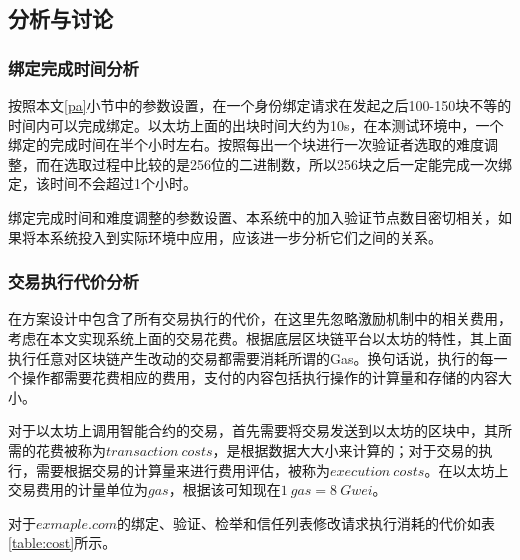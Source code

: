 \subsection{分析与讨论}

\subsubsection{绑定完成时间分析}

按照本文\ref{pa}小节中的参数设置，在一个身份绑定请求在发起之后100-150块不等的时间内可以完成绑定。以太坊上面的出块时间大约为10s，在本测试环境中，一个绑定的完成时间在半个小时左右。按照每出一个块进行一次验证者选取的难度调整，而在选取过程中比较的是256位的二进制数，所以256块之后一定能完成一次绑定，该时间不会超过1个小时。

绑定完成时间和难度调整的参数设置、本系统中的加入验证节点数目密切相关，如果将本系统投入到实际环境中应用，应该进一步分析它们之间的关系。



\subsubsection{交易执行代价分析}

在方案设计中包含了所有交易执行的代价，在这里先忽略激励机制中的相关费用，考虑在本文实现系统上面的交易花费。根据底层区块链平台以太坊的特性，其上面执行任意对区块链产生改动的交易都需要消耗所谓的Gas。换句话说，执行的每一个操作都需要花费相应的费用，支付的内容包括执行操作的计算量和存储的内容大小。

对于以太坊上调用智能合约的交易，首先需要将交易发送到以太坊的区块中，其所需的花费被称为$transaction\ costs$，是根据数据大大小来计算的；对于交易的执行，需要根据交易的计算量来进行费用评估，被称为$execution\ costs$。在以太坊上交易费用的计量单位为$gas$，根据该\parencite{ethgasstation}可知现在$1\ gas = 8\ Gwei$。

对于$exmaple.com$的绑定、验证、检举和信任列表修改请求执行消耗的代价如表\ref{table:cost}所示。



